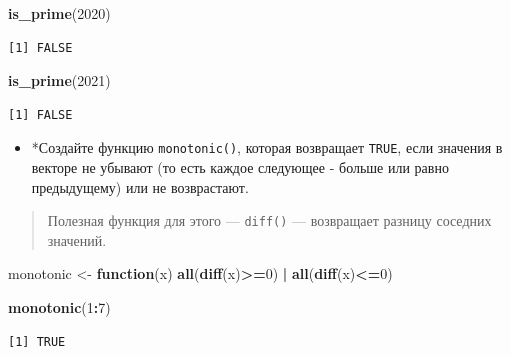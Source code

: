 \documentclass[
]{book}
\newenvironment{Shaded}{\begin{snugshade}}{\end{snugshade}}
\newcommand{\ControlFlowTok}[1]{\textcolor[rgb]{0.13,0.29,0.53}{\textbf{#1}}}
\newcommand{\DecValTok}[1]{\textcolor[rgb]{0.00,0.00,0.81}{#1}}
\newcommand{\KeywordTok}[1]{\textcolor[rgb]{0.13,0.29,0.53}{\textbf{#1}}}
\newcommand{\NormalTok}[1]{#1}
\newcommand{\OperatorTok}[1]{\textcolor[rgb]{0.81,0.36,0.00}{\textbf{#1}}}
\newcommand{\StringTok}[1]{\textcolor[rgb]{0.31,0.60,0.02}{#1}}
\providecommand{\tightlist}{%
  \setlength{\itemsep}{0pt}\setlength{\parskip}{0pt}}
\begin{document}
\begin{Shaded}
\begin{Highlighting}[]
\KeywordTok{is_prime}\NormalTok{(}\DecValTok{2020}\NormalTok{)}
\end{Highlighting}
\end{Shaded}

\begin{verbatim}
[1] FALSE
\end{verbatim}

\begin{Shaded}
\begin{Highlighting}[]
\KeywordTok{is_prime}\NormalTok{(}\DecValTok{2021}\NormalTok{)}
\end{Highlighting}
\end{Shaded}

\begin{verbatim}
[1] FALSE
\end{verbatim}

\begin{itemize}
\tightlist
\item
  *Создайте функцию \texttt{monotonic()}, которая возвращает \texttt{TRUE}, если значения в векторе не убывают (то есть каждое следующее - больше или равно предыдущему) или не возврастают.
\end{itemize}

\begin{quote}
Полезная функция для этого --- \texttt{diff()} --- возвращает разницу соседних значений.
\end{quote}

\begin{Shaded}
\begin{Highlighting}[]
\NormalTok{monotonic <-}\StringTok{ }\ControlFlowTok{function}\NormalTok{(x) }\KeywordTok{all}\NormalTok{(}\KeywordTok{diff}\NormalTok{(x)}\OperatorTok{>=}\DecValTok{0}\NormalTok{) }\OperatorTok{|}\StringTok{ }\KeywordTok{all}\NormalTok{(}\KeywordTok{diff}\NormalTok{(x)}\OperatorTok{<=}\DecValTok{0}\NormalTok{)}
\end{Highlighting}
\end{Shaded}

\begin{Shaded}
\begin{Highlighting}[]
\KeywordTok{monotonic}\NormalTok{(}\DecValTok{1}\OperatorTok{:}\DecValTok{7}\NormalTok{)}
\end{Highlighting}
\end{Shaded}

\begin{verbatim}
[1] TRUE
\end{verbatim}
\end{document}
